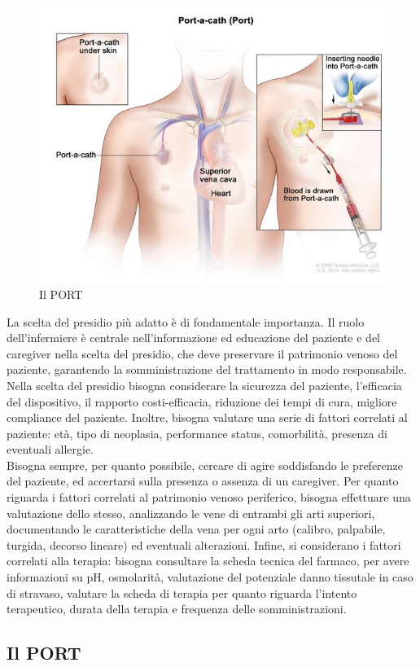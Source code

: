 \begin{figure}[H]
    \begin{center}
    \includegraphics[width=0.4\columnwidth]{img/PORT.jpeg}
    \vspace{-3mm}
    \end{center}
    \caption{Il PORT
    \cite{img42}}
    \label{fig:FIGURE_4.5}
\end{figure}

La scelta del presidio più adatto è di fondamentale importanza. Il ruolo dell'infermiere è centrale 
nell'informazione ed educazione del paziente e del caregiver nella scelta del presidio, che deve preservare 
il patrimonio venoso del paziente, garantendo la somministrazione del trattamento in modo responsabile\cite{AIOMCVC}. 
Nella scelta del presidio bisogna considerare la sicurezza del paziente, l'efficacia del dispositivo, il rapporto 
costi-efficacia, riduzione dei tempi di cura, migliore compliance del paziente. Inoltre, bisogna valutare una serie 
di fattori correlati al paziente: età, tipo di  neoplasia, performance status, comorbilità, presenza 
di eventuali allergie\cite{AIOMCVC}.\\
Bisogna sempre, per quanto possibile, cercare di agire soddisfando le preferenze del paziente, 
ed accertarsi sulla presenza o assenza di un caregiver. Per quanto riguarda i fattori correlati al patrimonio 
venoso periferico, bisogna effettuare una valutazione dello stesso, analizzando le vene di entrambi gli arti superiori,
documentando le caratteristiche della vena per ogni arto (calibro, palpabile, turgida, decorso lineare) ed eventuali 
alterazioni\cite{AIOMCVC}. Infine, si considerano i fattori correlati alla terapia: bisogna consultare la scheda tecnica del farmaco,
per avere informazioni su pH, osmolarità, valutazione del potenziale danno tissutale in caso di stravaso, valutare la 
scheda di terapia per quanto riguarda l'intento terapeutico, durata della terapia e frequenza delle somministrazioni\cite{AIOMCVC}.

\subsection{Il PORT}

